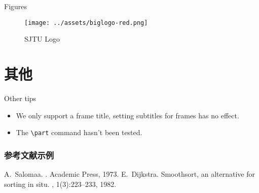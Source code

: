 \documentclass[no-math, aspectratio=1610, 10pt]{beamer}
\begin{document}
    \begin{frame}{Figures}
        \begin{figure}
            \texttt{[image: ../assets/biglogo-red.png]}
            \caption{SJTU Logo}
        \end{figure}
    \end{frame}

    \section{其他}

    \begin{frame}[fragile]{Other tips}
        \begin{itemize}
            \item We only support a frame title, setting subtitles for frames has no effect.
            \item The \verb|\part| command hasn't been tested.
        \end{itemize}
    \end{frame}

    \begin{frame}
        \frametitle{参考文献示例}
        \begin{thebibliography}{Dijkstra, 1982}
          A.~Salomaa.
          .
          \newblock Academic Press, 1973.
          E.~Dijkstra.
          \newblock Smoothsort, an alternative for sorting in situ.
          , 1(3):223--233, 1982.
        \end{thebibliography}
      \end{frame}
\end{document}
